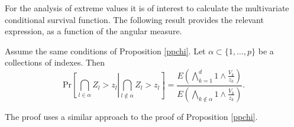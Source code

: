 For the analysis of extreme values it is of interest to calculate the multivariate conditional survival function. The following result provides the relevant expression, as a function of the angular measure.
\begin{prop}
Assume the same conditions of Proposition \ref{ppchi}. 
Let $\alpha \subset \{1, \ldots ,p\}$ be a collections of indexes. 
Then     
\begin{equation} \label{eqn:condsurv2df}
    \text{Pr}\left[\bigcap_{l \in \alpha} Z_l > z_l \right|\left. \bigcap_{l\not\in\alpha} Z_l > z_l\right] =
      \frac{E\left(\bigwedge_{k = 1}^d 1\wedge \frac{V_k}{z_k}\right)}{E\left(\bigwedge_{k \not\in\alpha}1\wedge\frac{V_k}{z_k}\right)}.
  \end{equation}
\end{prop}  
The proof uses a similar approach to the proof of Proposition \ref{ppchi}.




